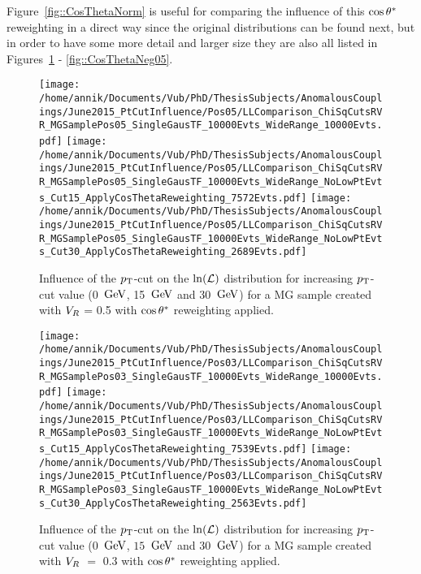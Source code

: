 Figure~\ref{fig::CosThetaNorm} is useful for comparing the influence of this $\cos \theta^{*}$ reweighting in a direct way since the original distributions can be found next, but in order to have some more detail and larger size they are also all listed in Figures~\ref{fig::CosThetaPos05} - \ref{fig::CosThetaNeg05}.

\begin{figure}[h!t]
 \centering
 \texttt{[image: /home/annik/Documents/Vub/PhD/ThesisSubjects/AnomalousCouplings/June2015\_PtCutInfluence/Pos05/LLComparison\_ChiSqCutsRVR\_MGSamplePos05\_SingleGausTF\_10000Evts\_WideRange\_10000Evts.pdf]}
 \texttt{[image: /home/annik/Documents/Vub/PhD/ThesisSubjects/AnomalousCouplings/June2015\_PtCutInfluence/Pos05/LLComparison\_ChiSqCutsRVR\_MGSamplePos05\_SingleGausTF\_10000Evts\_WideRange\_NoLowPtEvts\_Cut15\_ApplyCosThetaReweighting\_7572Evts.pdf]}
 \texttt{[image: /home/annik/Documents/Vub/PhD/ThesisSubjects/AnomalousCouplings/June2015\_PtCutInfluence/Pos05/LLComparison\_ChiSqCutsRVR\_MGSamplePos05\_SingleGausTF\_10000Evts\_WideRange\_NoLowPtEvts\_Cut30\_ApplyCosThetaReweighting\_2689Evts.pdf]}
 \caption{Influence of the $p_{\textrm T}$-cut on the $\ln(\mathcal{L})$ distribution for increasing $p_{\textrm T}$-cut value (0 $\, \mathrm{GeV}$, 15 $\, \mathrm{GeV}$ and 30 $\, \mathrm{GeV}$) for a MG sample created with $V_{R}$ = 0.5 with $\cos \theta^{*}$ reweighting applied.}
 \label{fig::CosThetaPos05}
\end{figure}

\begin{figure}[h!t]
 \centering
 \texttt{[image: /home/annik/Documents/Vub/PhD/ThesisSubjects/AnomalousCouplings/June2015\_PtCutInfluence/Pos03/LLComparison\_ChiSqCutsRVR\_MGSamplePos03\_SingleGausTF\_10000Evts\_WideRange\_10000Evts.pdf]}
 \texttt{[image: /home/annik/Documents/Vub/PhD/ThesisSubjects/AnomalousCouplings/June2015\_PtCutInfluence/Pos03/LLComparison\_ChiSqCutsRVR\_MGSamplePos03\_SingleGausTF\_10000Evts\_WideRange\_NoLowPtEvts\_Cut15\_ApplyCosThetaReweighting\_7539Evts.pdf]}
 \texttt{[image: /home/annik/Documents/Vub/PhD/ThesisSubjects/AnomalousCouplings/June2015\_PtCutInfluence/Pos03/LLComparison\_ChiSqCutsRVR\_MGSamplePos03\_SingleGausTF\_10000Evts\_WideRange\_NoLowPtEvts\_Cut30\_ApplyCosThetaReweighting\_2563Evts.pdf]}
 \caption{Influence of the $p_{\textrm T}$-cut on the $\ln(\mathcal{L})$ distribution for increasing $p_{\textrm T}$-cut value ($0$ $\, \mathrm{GeV}$, $15$ $\, \mathrm{GeV}$ and $30$ $\, \mathrm{GeV}$) for a MG sample created with $V_{R}$ $=$ $0.3$ with $\cos \theta^{*}$ reweighting applied.}
 \label{fig::CosThetaPos03}
\end{figure}

